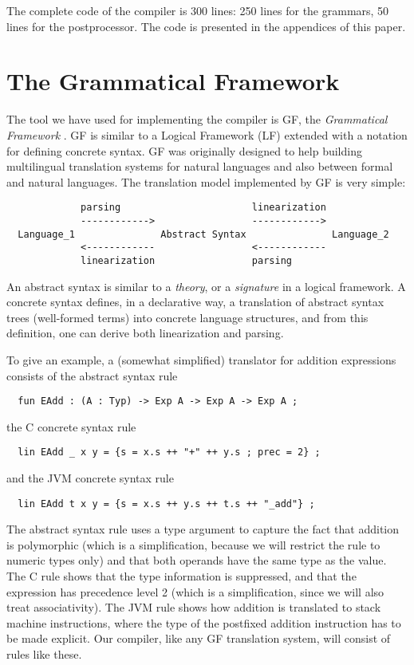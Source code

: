 \documentclass[12pt]{article}
\newcommand{\empha}[1]{{\em #1}}
\begin{document}
The complete code of the compiler is 300 lines: 250 lines for the grammars,
50 lines for the postprocessor. The code 
is presented in the appendices of this paper.



\section{The Grammatical Framework}

The tool we have used for implementing the compiler is
GF, the \empha{Grammatical Framework} \cite{gf-jfp}. GF 
is similar to a Logical Framework (LF) 
\cite{harper-honsell}
extended with
a notation for defining concrete syntax. GF was originally
designed to help building multilingual
translation systems for natural languages and also
between formal and natural languages. The translation model
implemented by GF is very simple:
\begin{verbatim}
             parsing                       linearization
             ------------>                 ------------>
  Language_1               Abstract Syntax               Language_2
             <------------                 <------------
             linearization                 parsing
\end{verbatim}
An abstract syntax is similar to a \empha{theory}, or a
\empha{signature} in a logical framework. A 
concrete syntax defines, in a declarative way,
a translation of abstract syntax trees (well-formed terms) 
into concrete language structures, and from this definition, one can
derive both linearization and parsing. 

To give an example,
a (somewhat simplified) translator for addition expressions
consists of the abstract syntax rule
\begin{verbatim}
  fun EAdd : (A : Typ) -> Exp A -> Exp A -> Exp A ;
\end{verbatim}
the C concrete syntax rule
\begin{verbatim}
  lin EAdd _ x y = {s = x.s ++ "+" ++ y.s ; prec = 2} ;
\end{verbatim}
and the JVM concrete syntax rule
\begin{verbatim}
  lin EAdd t x y = {s = x.s ++ y.s ++ t.s ++ "_add"} ;
\end{verbatim}
The abstract syntax rule uses a type argument to capture
the fact that addition is polymorphic (which is a simplification,
because we will restrict the rule to numeric types only)
and that both operands have the same type as the value.
The C rule shows that the type information is suppressed,
and that the expression has precedence level 2 (which is a simplification,
since we will also treat associativity).
The JVM rule shows how addition is translated to stack machine
instructions, where the type of the postfixed addition instruction has to
be made explicit. Our compiler, like any GF translation system, will
consist of rules like these.
\end{document}
